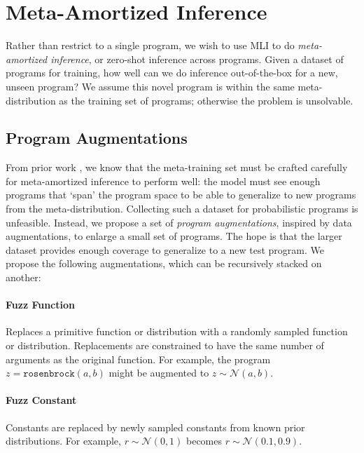 \section{Meta-Amortized Inference}
\label{sec:meta}

Rather than restrict to a single program, we wish to use MLI to do \textit{meta-amortized inference}, or zero-shot inference across programs.
Given a dataset of programs for training, how well can we do inference out-of-the-box for a new, unseen program? We assume this novel program is within the same meta-distribution as the training set of programs; otherwise the problem is unsolvable.

\subsection{Program Augmentations}

From prior work \cite{gordon2018meta,choi2019meta,che2021meta}, we know that the meta-training set must be crafted carefully for meta-amortized inference to perform well: the model must see enough programs that `span' the program space to be able to generalize to new programs from the meta-distribution. Collecting such a dataset for probabilistic programs is unfeasible. Instead, we propose a set of \textit{program augmentations}, inspired by data augmentations, to enlarge a small set of programs. The hope is that the larger dataset provides enough coverage to generalize to a new test program.
We propose the following augmentations, which can be recursively stacked on another:

\paragraph{Fuzz Function} Replaces a primitive function or distribution with a randomly sampled function or distribution. Replacements are constrained to have the same number of arguments as the original function. For example, the program $z = \texttt{rosenbrock}(a, b)$ might be augmented to $z \sim \mathcal{N}(a, b)$.

\paragraph{Fuzz Constant} Constants are replaced by newly sampled constants from known prior distributions. For example, $r \sim \mathcal{N}(0, 1)$ becomes $r \sim \mathcal{N}(0.1, 0.9)$.

